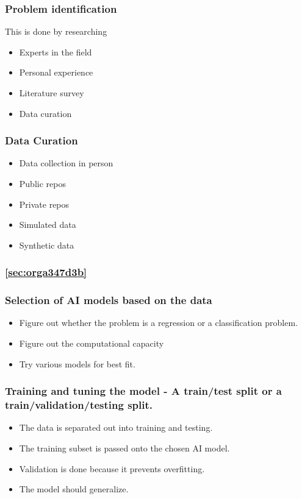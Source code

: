 \documentclass[11pt]{article}
\begin{document}
\subsubsection{Problem identification}
\label{sec:orgc579aec}
This is done by researching
\begin{itemize}
\item Experts in the field
\item Personal experience
\item Literature survey
\item Data curation
\end{itemize}
\subsubsection{Data Curation}
\label{sec:org713e265}
\begin{itemize}
\item Data collection in person
\item Public repos
\item Private repos
\item Simulated data
\item Synthetic data
\end{itemize}
\subsubsection{\ref{sec:orga347d3b}}
\label{sec:org209225a}
\subsubsection{Selection of AI models based on the data}
\label{sec:orgb64486c}
\begin{itemize}
\item Figure out whether the problem is a regression or a classification problem.
\item Figure out the computational capacity
\item Try various models for best fit.
\end{itemize}
\subsubsection{Training and tuning the model - A train/test split or a train/validation/testing split.}
\label{sec:orgc53fad5}
\begin{itemize}
\item The data is separated out into training and testing.
\item The training subset is passed onto the chosen AI model.
\item Validation is done because it prevents overfitting.
\item The model should generalize.
\end{itemize}
\end{document}
